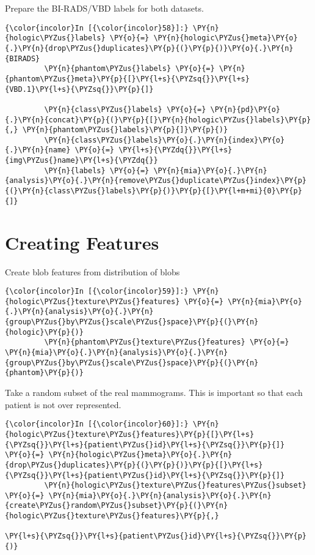     Prepare the BI-RADS/VBD labels for both datasets.

    \begin{Verbatim}[commandchars=\\\{\}]
{\color{incolor}In [{\color{incolor}58}]:} \PY{n}{hologic\PYZus{}labels} \PY{o}{=} \PY{n}{hologic\PYZus{}meta}\PY{o}{.}\PY{n}{drop\PYZus{}duplicates}\PY{p}{(}\PY{p}{)}\PY{o}{.}\PY{n}{BIRADS}
         \PY{n}{phantom\PYZus{}labels} \PY{o}{=} \PY{n}{phantom\PYZus{}meta}\PY{p}{[}\PY{l+s}{\PYZsq{}}\PY{l+s}{VBD.1}\PY{l+s}{\PYZsq{}}\PY{p}{]}

         \PY{n}{class\PYZus{}labels} \PY{o}{=} \PY{n}{pd}\PY{o}{.}\PY{n}{concat}\PY{p}{(}\PY{p}{[}\PY{n}{hologic\PYZus{}labels}\PY{p}{,} \PY{n}{phantom\PYZus{}labels}\PY{p}{]}\PY{p}{)}
         \PY{n}{class\PYZus{}labels}\PY{o}{.}\PY{n}{index}\PY{o}{.}\PY{n}{name} \PY{o}{=} \PY{l+s}{\PYZdq{}}\PY{l+s}{img\PYZus{}name}\PY{l+s}{\PYZdq{}}
         \PY{n}{labels} \PY{o}{=} \PY{n}{mia}\PY{o}{.}\PY{n}{analysis}\PY{o}{.}\PY{n}{remove\PYZus{}duplicate\PYZus{}index}\PY{p}{(}\PY{n}{class\PYZus{}labels}\PY{p}{)}\PY{p}{[}\PY{l+m+mi}{0}\PY{p}{]}
\end{Verbatim}

    \section{Creating Features}\label{creating-features}

    Create blob features from distribution of blobs

    \begin{Verbatim}[commandchars=\\\{\}]
{\color{incolor}In [{\color{incolor}59}]:} \PY{n}{hologic\PYZus{}texture\PYZus{}features} \PY{o}{=} \PY{n}{mia}\PY{o}{.}\PY{n}{analysis}\PY{o}{.}\PY{n}{group\PYZus{}by\PYZus{}scale\PYZus{}space}\PY{p}{(}\PY{n}{hologic}\PY{p}{)}
         \PY{n}{phantom\PYZus{}texture\PYZus{}features} \PY{o}{=} \PY{n}{mia}\PY{o}{.}\PY{n}{analysis}\PY{o}{.}\PY{n}{group\PYZus{}by\PYZus{}scale\PYZus{}space}\PY{p}{(}\PY{n}{phantom}\PY{p}{)}
\end{Verbatim}

    Take a random subset of the real mammograms. This is important so that
each patient is not over represented.

    \begin{Verbatim}[commandchars=\\\{\}]
{\color{incolor}In [{\color{incolor}60}]:} \PY{n}{hologic\PYZus{}texture\PYZus{}features}\PY{p}{[}\PY{l+s}{\PYZsq{}}\PY{l+s}{patient\PYZus{}id}\PY{l+s}{\PYZsq{}}\PY{p}{]} \PY{o}{=} \PY{n}{hologic\PYZus{}meta}\PY{o}{.}\PY{n}{drop\PYZus{}duplicates}\PY{p}{(}\PY{p}{)}\PY{p}{[}\PY{l+s}{\PYZsq{}}\PY{l+s}{patient\PYZus{}id}\PY{l+s}{\PYZsq{}}\PY{p}{]}
         \PY{n}{hologic\PYZus{}texture\PYZus{}features\PYZus{}subset} \PY{o}{=} \PY{n}{mia}\PY{o}{.}\PY{n}{analysis}\PY{o}{.}\PY{n}{create\PYZus{}random\PYZus{}subset}\PY{p}{(}\PY{n}{hologic\PYZus{}texture\PYZus{}features}\PY{p}{,}
                                                                             \PY{l+s}{\PYZsq{}}\PY{l+s}{patient\PYZus{}id}\PY{l+s}{\PYZsq{}}\PY{p}{)}
\end{Verbatim}

